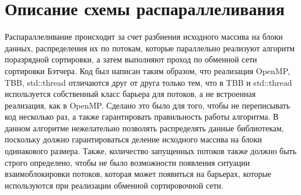 \documentclass{report}
\begin{document}
\newpage

\section*{Описание схемы распараллеливания}
\par Распараллеливание происходит за счет разбиения исходного массива на блоки данных, распределения их по потокам, которые параллельно реализуют алгоритм поразрядной сортировки, а затем выполняют проход по обменной сети сортировки Бэтчера. Код был написан таким образом, что реализация OpenMP, TBB, std::thread отличаются друг от друга только тем, что в TBB и std::thread используется собственный класс барьера для потоков, а не встроенная реализация, как в OpenMP. Сделано это было для того, чтобы не переписывать код несколько раз, а также гарантировать правильность работы алгоритма. В данном алгоритме нежелательно позволять распределять данные библиотекам, поскольку должно гарантироваться деление исходного массива на блоки одинакового размера. Также, количество запущенных потоков также должно быть строго определено, чтобы не было возможности появления ситуации взаимоблокировки потоков, которая может появиться на барьерах, которые используются при реализации обменной сортировочной сети.

\newpage

\end{document}
